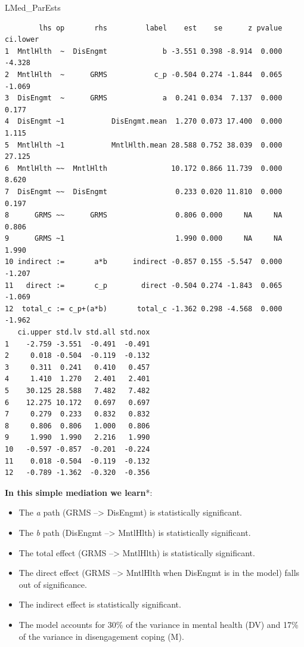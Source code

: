 \documentclass[
]{book}
\newenvironment{Shaded}{\begin{snugshade}}{\end{snugshade}}
\newcommand{\NormalTok}[1]{#1}
\providecommand{\tightlist}{%
  \setlength{\itemsep}{0pt}\setlength{\parskip}{0pt}}
\begin{document}
\begin{Shaded}
\begin{Highlighting}[]
\NormalTok{LMed\_ParEsts}
\end{Highlighting}
\end{Shaded}

\begin{verbatim}
        lhs op       rhs         label    est    se      z pvalue ci.lower
1  MntlHlth  ~  DisEngmt             b -3.551 0.398 -8.914  0.000   -4.328
2  MntlHlth  ~      GRMS           c_p -0.504 0.274 -1.844  0.065   -1.069
3  DisEngmt  ~      GRMS             a  0.241 0.034  7.137  0.000    0.177
4  DisEngmt ~1           DisEngmt.mean  1.270 0.073 17.400  0.000    1.115
5  MntlHlth ~1           MntlHlth.mean 28.588 0.752 38.039  0.000   27.125
6  MntlHlth ~~  MntlHlth               10.172 0.866 11.739  0.000    8.620
7  DisEngmt ~~  DisEngmt                0.233 0.020 11.810  0.000    0.197
8      GRMS ~~      GRMS                0.806 0.000     NA     NA    0.806
9      GRMS ~1                          1.990 0.000     NA     NA    1.990
10 indirect :=       a*b      indirect -0.857 0.155 -5.547  0.000   -1.207
11   direct :=       c_p        direct -0.504 0.274 -1.843  0.065   -1.069
12  total_c := c_p+(a*b)       total_c -1.362 0.298 -4.568  0.000   -1.962
   ci.upper std.lv std.all std.nox
1    -2.759 -3.551  -0.491  -0.491
2     0.018 -0.504  -0.119  -0.132
3     0.311  0.241   0.410   0.457
4     1.410  1.270   2.401   2.401
5    30.125 28.588   7.482   7.482
6    12.275 10.172   0.697   0.697
7     0.279  0.233   0.832   0.832
8     0.806  0.806   1.000   0.806
9     1.990  1.990   2.216   1.990
10   -0.597 -0.857  -0.201  -0.224
11    0.018 -0.504  -0.119  -0.132
12   -0.789 -1.362  -0.320  -0.356
\end{verbatim}

\textbf{In this simple mediation we learn}*:

\begin{itemize}
\tightlist
\item
  The \emph{a} path (GRMS --\textgreater{} DisEngmt) is statistically significant.
\item
  The \emph{b} path (DisEngmt --\textgreater{} MntlHlth) is statistically significant.
\item
  The total effect (GRMS --\textgreater{} MntlHlth) is statistically significant.
\item
  The direct effect (GRMS --\textgreater{} MntlHlth when DisEngmt is in the model) falls out of significance.
\item
  The indirect effect is statistically significant.
\item
  The model accounts for 30\% of the variance in mental health (DV) and 17\% of the variance in disengagement coping (M).
\end{itemize}
\end{document}

